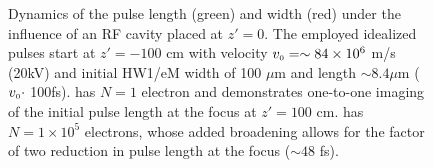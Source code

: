 \begin{figure}
  \centerline {
    \subfloat[][]{
      \label{fig:rf_cav_N1}
      \begin{tikzpicture}
        
      \end{tikzpicture}
    }
    \subfloat[][]{
      \label{fig:rf_cav_N1e5}
      \begin{tikzpicture}
        
      \end{tikzpicture}
    }
  }
  \caption[Dynamics of the pulse length and width under the influence of an RF cavity]{
    Dynamics of the pulse length (green) and width (red) under the influence of an RF cavity placed at $z' = 0$.
    The employed idealized pulses start at $z'= -100$ cm with velocity $v_{{\scriptscriptstyle 0}} = \sim 84 \times 10^{6}$ m/s (20kV) and initial HW1/eM width of 100 $\mu$m and length $\sim 8.4 \mu$m ($v_{{\scriptscriptstyle 0}} \cdot $ 100fs).
     has $N=1$ electron and demonstrates one-to-one imaging of the initial pulse length at the focus at $ z' = 100 $ cm.
     has $ N = 1 \times 10^5 $ electrons, whose added broadening allows for the factor of two reduction in pulse length at the focus ($\sim 48$ fs).
  }
  \label{fig:rf_cav_num}
\end{figure}
